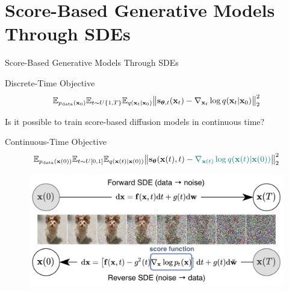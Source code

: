 \documentclass{beamer}
\begin{document}
\section{Score-Based Generative Models Through SDEs}
\begin{frame}{Score-Based Generative Models Through SDEs}
	\begin{block}{Discrete-Time Objective}
		\vspace{-0.3cm}
		\[
			\mathbb{E}_{p_{\text{data}}(\mathbf{x}_0)} \mathbb{E}_{t \sim U\{1, T\}} \mathbb{E}_{q(\mathbf{x}_t | \mathbf{x}_0)}\bigl\| \mathbf{s}_{\boldsymbol{\theta}, t}(\mathbf{x}_t) - \nabla_{\mathbf{x}_t} \log q(\mathbf{x}_t | \mathbf{x}_0) \bigr\|^2_2 
		\]
		\vspace{-0.5cm}
	\end{block}
	Is it possible to train score-based diffusion models in continuous time?
    \eqpause
	\begin{block}{Continuous-Time Objective}
		\vspace{-0.7cm}
		\[
			\mathbb{E}_{p_{\text{data}}(\mathbf{x}(0))} \mathbb{E}_{t \sim U[0, 1]} \mathbb{E}_{q(\mathbf{x}(t) | \mathbf{x}(0))}\bigl\| \mathbf{s}_{\boldsymbol{\theta}}(\mathbf{x}(t), t) - {\color{teal}\nabla_{\mathbf{x}(t)} \log q(\mathbf{x}(t) | \mathbf{x}(0))} \bigr\|^2_2 
		\]
		\vspace{-0.7cm}
	\end{block}
    \eqpause
	\vspace{-0.4cm}
	\begin{figure}
		\includegraphics[width=0.75\linewidth]{figs/sbgm}
	\end{figure}
\end{frame}
\end{document}
